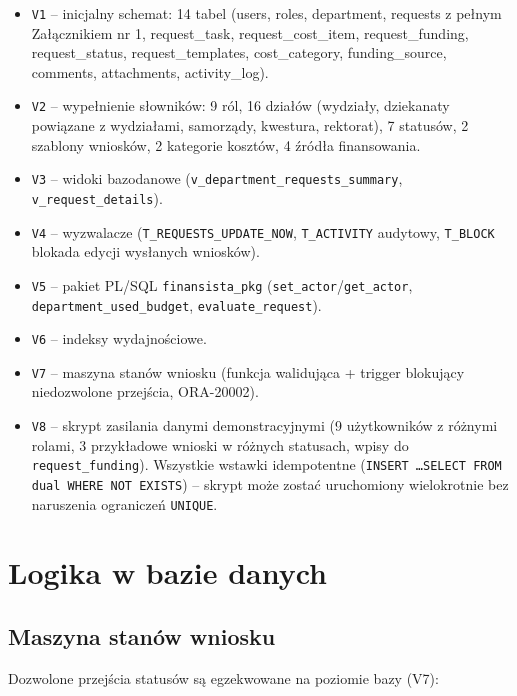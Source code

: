 \documentclass[12pt,a4paper]{article}
\begin{document}
\begin{itemize}[leftmargin=*]
  \item \texttt{V1} -- inicjalny schemat: 14 tabel (users, roles, department,
        requests z pełnym Załącznikiem nr 1, request\_task, request\_cost\_item,
        request\_funding, request\_status, request\_templates, cost\_category,
        funding\_source, comments, attachments, activity\_log).
  \item \texttt{V2} -- wypełnienie słowników: 9 ról, 16 działów (wydziały,
        dziekanaty powiązane z wydziałami, samorządy, kwestura, rektorat),
        7 statusów, 2 szablony wniosków, 2 kategorie kosztów, 4 źródła
        finansowania.
  \item \texttt{V3} -- widoki bazodanowe (\texttt{v\_department\_requests\_summary},
        \texttt{v\_request\_details}).
  \item \texttt{V4} -- wyzwalacze (\texttt{T\_REQUESTS\_UPDATE\_NOW},
        \texttt{T\_ACTIVITY} audytowy, \texttt{T\_BLOCK} blokada edycji wysłanych wniosków).
  \item \texttt{V5} -- pakiet PL/SQL \texttt{finansista\_pkg}
        (\texttt{set\_actor}\slash\texttt{get\_actor}, \texttt{department\_used\_budget},
        \texttt{evaluate\_request}).
  \item \texttt{V6} -- indeksy wydajnościowe.
  \item \texttt{V7} -- maszyna stanów wniosku (funkcja walidująca + trigger
        blokujący niedozwolone przejścia, ORA-20002).
  \item \texttt{V8} -- skrypt zasilania danymi demonstracyjnymi (9 użytkowników
        z różnymi rolami, 3 przykładowe wnioski w różnych statusach, wpisy
        do \texttt{request\_funding}). Wszystkie wstawki idempotentne
        (\texttt{INSERT \ldots SELECT FROM dual WHERE NOT EXISTS}) --
        skrypt może zostać uruchomiony wielokrotnie bez naruszenia
        ograniczeń \texttt{UNIQUE}.
\end{itemize}

\section{Logika w bazie danych}
\label{sec:plsql}

\subsection{Maszyna stanów wniosku}
Dozwolone przejścia statusów są egzekwowane na poziomie bazy (V7):
\end{document}
